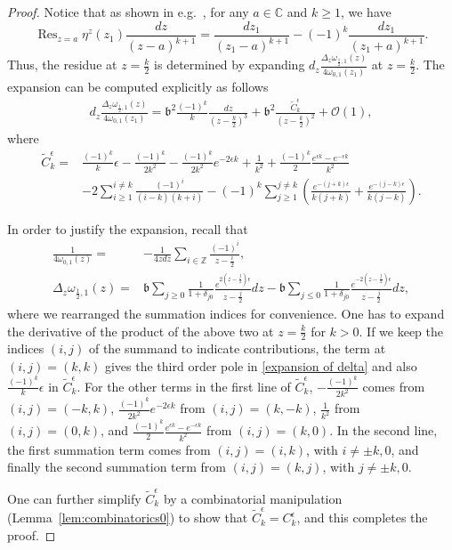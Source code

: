 \documentclass[12pt]{amsart}
\DeclareMathOperator*{\Res}{Res}
\theoremstyle{plain}
\theoremstyle{definition}
\theoremstyle{remark}
\numberwithin{equation}{section}
\begin{document}
\begin{proof}
    Notice that as shown in e.g.~\cite[Section 2]{Osu23-1}, for any $a\in\mathbb{C}$ and $k\geq1$, we have
    \begin{equation}
        \Res_{z=a}\eta^z(z_1)\frac{dz}{(z-a)^{k+1}}=\frac{dz_1}{(z_1-a)^{k+1}}-(-1)^{k}\frac{dz_1}{(z_1+a)^{k+1}}.\label{eta-projection}
    \end{equation}
    Thus, the residue at $z=\frac{k}{2}$ is determined by expanding $d_z\frac{\Delta_{z}\omega_{\frac12,1}(z)}{4\omega_{0,1}(z_1)}$ at $z=\frac{k}{2}$. The expansion can be computed explicitly as follows
    \begin{align}
        d_z\frac{\Delta_{z}\omega_{\frac12,1}(z)}{4\omega_{0,1}(z_1)}=\mathfrak{b}^2\frac{(-1)^k}{k}\frac{dz}{\left(z-\frac{k}{2}\right)^3}+\mathfrak{b}^2\frac{\tilde C_k^\epsilon}{\left(z-\frac{k}{2}\right)^2}+\mathcal{O}(1),\label{expansion of delta}
    \end{align}
    where
     \begin{align}
       \tilde C_k^\epsilon =&\frac{(-1)^k}{k}\epsilon-\frac{(-1)^k}{2k^2}-\frac{(-1)^k}{2k^2}e^{-2\epsilon k}+\frac{1}{k^2}+\frac{(-1)^k}{2}\frac{e^{\epsilon k}-e^{-\epsilon k}}{k^2}\nonumber\\
&-2\sum_{i\geq1}^{i\neq k}\frac{(-1)^i}{(i-k)(k+i)}
-(-1)^k\sum_{j\geq1}^{j\neq k}\left(\frac{e^{-(j+k)\epsilon}}{k(j+k)}+\frac{e^{-(j-k)\epsilon}}{k(j-k)}\right).\label{tilde C_k^epsilon}
    \end{align}


In order to justify the expansion, recall that
    \begin{align*}
         \frac{1}{4\omega_{0,1}(z)}=&-\frac{1}{4zdz}\sum_{i\in\mathbb{Z}}\frac{(-1)^i}{z-\frac{i}{2}},\\
          \Delta_z\omega_{\frac12,1}(z)=&\mathfrak{b}\sum_{j\geq0}\frac{1}{1+\delta_{j0}}\frac{e^{2(z-\frac{j}{2})\epsilon}}{z-\frac{j}{2}}dz-\mathfrak{b}\sum_{j\leq0}\frac{1}{1+\delta_{j0}}\frac{e^{-2(z-\frac{j}{2})\epsilon}}{z-\frac{j}{2}}dz,
    \end{align*}
        where we rearranged the summation indices for convenience. One has to expand the derivative of the product of the above two at $z=\frac{k}{2}$ for $k>0$. If we keep the indices $(i,j)$ of the summand to indicate contributions, the term at $(i,j)=(k,k)$ gives the third order pole in  \eqref{expansion of delta} and also $\frac{(-1)^k}{k}\epsilon$ in $\tilde C^\epsilon_k$. For the other terms in the first line of $\tilde C^\epsilon_k$, $-\frac{(-1)^k}{2k^2}$ comes from $(i,j)=(-k,k)$, $\frac{(-1)^k}{2k^2}e^{-2\epsilon k}$ from $(i,j)=(k,-k)$, $\frac{1}{k^2}$ from $(i,j)=(0,k)$, and $\frac{(-1)^k}{2}\frac{e^{\epsilon k}-e^{-\epsilon k}}{k^2}$ from $(i,j)=(k,0)$. In the second line, the first summation term comes from $(i,j)=(i,k)$, with $i\neq\pm k,0$, and finally the second summation term from $(i,j)=(k,j)$, with $j\neq \pm k,0$. 

One can further simplify $\tilde C_k^\epsilon$ by a combinatorial manipulation (Lemma~\ref{lem:combinatorics0}) to show that $\tilde C_k^\epsilon=C_k^\epsilon$, and this completes the proof. 
\end{proof}
\end{document}
